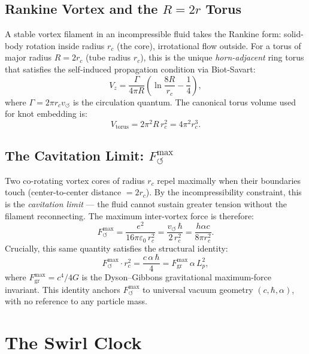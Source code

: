 \documentclass[11pt,a4paper]{article}
\begin{document}
\subsection{Rankine Vortex and the $R = 2r$ Torus}

A stable vortex filament in an incompressible fluid takes the Rankine form: solid-body
rotation inside radius $r_c$ (the core), irrotational flow outside. For a torus of
major radius $R = 2r_c$ (tube radius $r_c$), this is the unique \emph{horn-adjacent}
ring torus that satisfies the self-induced propagation condition via Biot-Savart:
\[
  V_z = \frac{\Gamma}{4\pi R}\left(\ln\frac{8R}{r_c} - \frac{1}{4}\right),
\]
where $\Gamma = 2\pi r_c v_{\circlearrowleft}$ is the circulation quantum. The
canonical torus volume used for knot embedding is:
\[
  V_\text{torus} = 2\pi^2 R\, r_c^2 = 4\pi^2 r_c^3.
\]

\subsection{The Cavitation Limit: $F_{\circlearrowleft}^{\max}$}

Two co-rotating vortex cores of radius $r_c$ repel maximally when their boundaries
touch (center-to-center distance $= 2r_c$). By the incompressibility constraint, this
is the \emph{cavitation limit} --- the fluid cannot sustain greater tension without
the filament reconnecting. The maximum inter-vortex force is therefore:
\[
  F_{\circlearrowleft}^{\max}
  = \frac{e^2}{16\pi\varepsilon_0\, r_c^2}
  = \frac{v_{\circlearrowleft}\,\hbar}{2\, r_c^2}
  = \frac{h\alpha c}{8\pi r_c^2}.
\]
Crucially, this same quantity satisfies the structural identity:
\begin{equation}\label{eq:cavitation}
  \boxed{F_{\circlearrowleft}^{\max} \cdot r_c^2 = \frac{c\,\alpha\,\hbar}{4}
  = F_\text{gr}^{\max}\,\alpha\, L_p^2,}
\end{equation}
where $F_\text{gr}^{\max} = c^4/4G$ is the Dyson--Gibbons gravitational
maximum-force invariant. This identity anchors $F_{\circlearrowleft}^{\max}$ to
universal vacuum geometry $(c, \hbar, \alpha)$, with no reference to any particle
mass.

\section{The Swirl Clock}\label{sec:clock}
\end{document}
